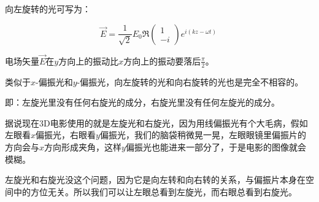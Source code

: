 \begin{enumerate}
向左旋转的光可写为：

\begin{equation}
\vec E = \frac{1}{\sqrt{2}} E_0 \Re \left(
\begin{array}{c}
1 \\ - i
\end{array}
\right) e^{i (kz - \omega t)}~
\end{equation}

电场矢量$\vec E$在$y$方向上的振动比$x$方向上的振动要落后$\frac{\pi}{2}$。

类似于$x$-偏振光和$y$-偏振光，向左旋转的光和向右旋转的光也是完全不相容的。

即：左旋光里没有任何右旋光的成分，右旋光里没有任何左旋光的成分。

据说现在3D电影使用的就是左旋光和右旋光，因为用线偏振光有个大毛病，假如左眼看$x$偏振光，右眼看$y$偏振光，我们的脑袋稍微晃一晃，左眼眼镜里偏振片的方向会与$x$方向形成夹角，这样$y$偏振光也能进来一部分了，于是电影的图像就会模糊。

左旋光和右旋光没这个问题，因为它是向左转和向右转的关系，与偏振片本身在空间中的方位无关。所以我们可以让左眼总看到左旋光，而右眼总看到右旋光。


\end{enumerate}